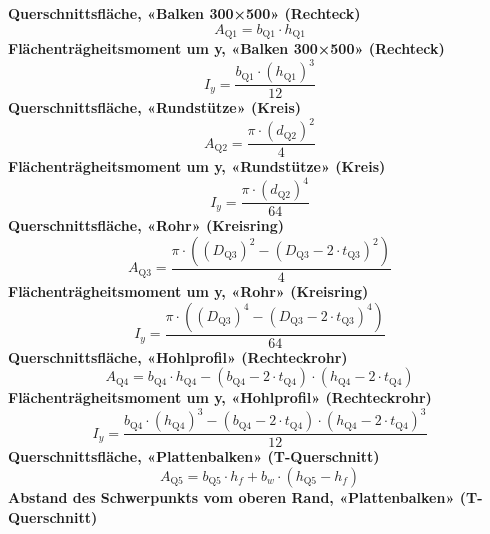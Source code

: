 \documentclass[11pt,a4paper]{article}
\begin{document}
\noindent\textbf{Querschnittsfläche, «Balken 300×500» (Rechteck)}
\begin{equation*}
A_{\text{Q1}} = b_{\text{Q1}} \cdot h_{\text{Q1}}
\end{equation*}
\noindent\textbf{Flächenträgheitsmoment um y, «Balken 300×500» (Rechteck)}
\begin{equation*}
I_{y} = \frac{b_{\text{Q1}} \cdot \left(h_{\text{Q1}}\right)^{3}}{12}
\end{equation*}
\noindent\textbf{Querschnittsfläche, «Rundstütze» (Kreis)}
\begin{equation*}
A_{\text{Q2}} = \frac{\pi \cdot \left(d_{\text{Q2}}\right)^{2}}{4}
\end{equation*}
\noindent\textbf{Flächenträgheitsmoment um y, «Rundstütze» (Kreis)}
\begin{equation*}
I_{y} = \frac{\pi \cdot \left(d_{\text{Q2}}\right)^{4}}{64}
\end{equation*}
\noindent\textbf{Querschnittsfläche, «Rohr» (Kreisring)}
\begin{equation*}
A_{\text{Q3}} = \frac{\pi \cdot \left(\left(D_{\text{Q3}}\right)^{2} - \left(D_{\text{Q3}} - 2 \cdot t_{\text{Q3}}\right)^{2}\right)}{4}
\end{equation*}
\noindent\textbf{Flächenträgheitsmoment um y, «Rohr» (Kreisring)}
\begin{equation*}
I_{y} = \frac{\pi \cdot \left(\left(D_{\text{Q3}}\right)^{4} - \left(D_{\text{Q3}} - 2 \cdot t_{\text{Q3}}\right)^{4}\right)}{64}
\end{equation*}
\noindent\textbf{Querschnittsfläche, «Hohlprofil» (Rechteckrohr)}
\begin{equation*}
A_{\text{Q4}} = b_{\text{Q4}} \cdot h_{\text{Q4}} - \left(b_{\text{Q4}} - 2 \cdot t_{\text{Q4}}\right) \cdot \left(h_{\text{Q4}} - 2 \cdot t_{\text{Q4}}\right)
\end{equation*}
\noindent\textbf{Flächenträgheitsmoment um y, «Hohlprofil» (Rechteckrohr)}
\begin{equation*}
I_{y} = \frac{b_{\text{Q4}} \cdot \left(h_{\text{Q4}}\right)^{3} - \left(b_{\text{Q4}} - 2 \cdot t_{\text{Q4}}\right) \cdot \left(h_{\text{Q4}} - 2 \cdot t_{\text{Q4}}\right)^{3}}{12}
\end{equation*}
\noindent\textbf{Querschnittsfläche, «Plattenbalken» (T-Querschnitt)}
\begin{equation*}
A_{\text{Q5}} = b_{\text{Q5}} \cdot h_{f} + b_{w} \cdot \left(h_{\text{Q5}} - h_{f}\right)
\end{equation*}
\noindent\textbf{Abstand des Schwerpunkts vom oberen Rand, «Plattenbalken» (T-Querschnitt)}
\end{document}

